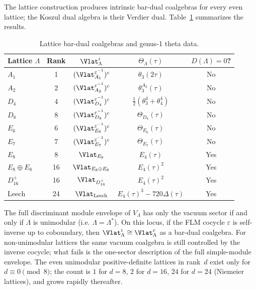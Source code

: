 The lattice construction produces intrinsic bar-dual coalgebras for every
even lattice; the Koszul dual algebra is their Verdier dual.
Table~\ref{tab:lattice:koszul-catalog} summarizes the results.

\begin{table}[ht]
\centering
\caption{Lattice bar-dual coalgebras and genus-1 theta data.}
\label{tab:lattice:koszul-catalog}
\begin{tabular}{l c c c c}
\textbf{Lattice $\Lambda$} & \textbf{Rank} & \textbf{$\Vlat_\Lambda^i$} & \textbf{$\Theta_\Lambda(\tau)$} & \textbf{$D(\Lambda)=0$?} \\
\hline
$A_1$ & 1 & $(\Vlat_{A_1}^{\varepsilon^{-1}})^c$ & $\theta_3(2\tau)$ & No \\
$A_2$ & 2 & $(\Vlat_{A_2}^{\varepsilon^{-1}})^c$ & $\theta_3^{A_2}(\tau)$ & No \\
$D_4$ & 4 & $(\Vlat_{D_4}^{\varepsilon^{-1}})^c$ & $\frac{1}{2}(\theta_3^4+\theta_4^4)$ & No \\
$D_8$ & 8 & $(\Vlat_{D_8}^{\varepsilon^{-1}})^c$ & $\Theta_{D_8}(\tau)$ & No \\
$E_6$ & 6 & $(\Vlat_{E_6}^{\varepsilon^{-1}})^c$ & $\Theta_{E_6}(\tau)$ & No \\
$E_7$ & 7 & $(\Vlat_{E_7}^{\varepsilon^{-1}})^c$ & $\Theta_{E_7}(\tau)$ & No \\
$E_8$ & 8 & $\Vlat_{E_8}$ & $E_4(\tau)$ & Yes \\
$E_8 \oplus E_8$ & 16 & $\Vlat_{E_8 \oplus E_8}$ & $E_4(\tau)^2$ & Yes \\
$D_{16}^+$ & 16 & $\Vlat_{D_{16}^+}$ & $E_4(\tau)^2$ & Yes \\
$\mathrm{Leech}$ & 24 & $\Vlat_{\mathrm{Leech}}$ & $E_4(\tau)^3 - 720\Delta(\tau)$ & Yes \\
\end{tabular}
\end{table}

\begin{proposition}\label{prop:lattice:self-dual-criterion}
The full discriminant module envelope of $V_\Lambda$ has only the
vacuum sector if and only if $\Lambda$ is unimodular
\textup{(}i.e. $\Lambda=\Lambda^*$\textup{)}. On this locus, if the
FLM cocycle $\varepsilon$ is self-inverse up to coboundary, then
$\Vlat_\Lambda^i\cong \Vlat_\Lambda^c$ as a bar-dual coalgebra.
For non-unimodular lattices the same vacuum coalgebra is still
controlled by the inverse cocycle; what fails is the one-sector
description of the full simple-module envelope.
The even unimodular positive-definite lattices in rank~$d$ exist only
for $d\equiv0\pmod 8$; the count is $1$ for $d=8$, $2$ for $d=16$,
$24$ for $d=24$ \textup{(}Niemeier lattices\textup{)}, and grows
rapidly thereafter.
\end{proposition}

